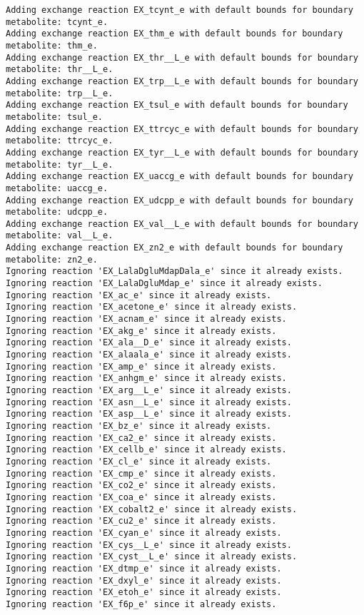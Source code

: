 \documentclass[
  letterpaper,
  DIV=11,
  numbers=noendperiod]{scrartcl}
\begin{document}
\begin{verbatim}
Adding exchange reaction EX_tcynt_e with default bounds for boundary metabolite: tcynt_e.
Adding exchange reaction EX_thm_e with default bounds for boundary metabolite: thm_e.
Adding exchange reaction EX_thr__L_e with default bounds for boundary metabolite: thr__L_e.
Adding exchange reaction EX_trp__L_e with default bounds for boundary metabolite: trp__L_e.
Adding exchange reaction EX_tsul_e with default bounds for boundary metabolite: tsul_e.
Adding exchange reaction EX_ttrcyc_e with default bounds for boundary metabolite: ttrcyc_e.
Adding exchange reaction EX_tyr__L_e with default bounds for boundary metabolite: tyr__L_e.
Adding exchange reaction EX_uaccg_e with default bounds for boundary metabolite: uaccg_e.
Adding exchange reaction EX_udcpp_e with default bounds for boundary metabolite: udcpp_e.
Adding exchange reaction EX_val__L_e with default bounds for boundary metabolite: val__L_e.
Adding exchange reaction EX_zn2_e with default bounds for boundary metabolite: zn2_e.
Ignoring reaction 'EX_LalaDgluMdapDala_e' since it already exists.
Ignoring reaction 'EX_LalaDgluMdap_e' since it already exists.
Ignoring reaction 'EX_ac_e' since it already exists.
Ignoring reaction 'EX_acetone_e' since it already exists.
Ignoring reaction 'EX_acnam_e' since it already exists.
Ignoring reaction 'EX_akg_e' since it already exists.
Ignoring reaction 'EX_ala__D_e' since it already exists.
Ignoring reaction 'EX_alaala_e' since it already exists.
Ignoring reaction 'EX_amp_e' since it already exists.
Ignoring reaction 'EX_anhgm_e' since it already exists.
Ignoring reaction 'EX_arg__L_e' since it already exists.
Ignoring reaction 'EX_asn__L_e' since it already exists.
Ignoring reaction 'EX_asp__L_e' since it already exists.
Ignoring reaction 'EX_bz_e' since it already exists.
Ignoring reaction 'EX_ca2_e' since it already exists.
Ignoring reaction 'EX_cellb_e' since it already exists.
Ignoring reaction 'EX_cl_e' since it already exists.
Ignoring reaction 'EX_cmp_e' since it already exists.
Ignoring reaction 'EX_co2_e' since it already exists.
Ignoring reaction 'EX_coa_e' since it already exists.
Ignoring reaction 'EX_cobalt2_e' since it already exists.
Ignoring reaction 'EX_cu2_e' since it already exists.
Ignoring reaction 'EX_cyan_e' since it already exists.
Ignoring reaction 'EX_cys__L_e' since it already exists.
Ignoring reaction 'EX_cyst__L_e' since it already exists.
Ignoring reaction 'EX_dtmp_e' since it already exists.
Ignoring reaction 'EX_dxyl_e' since it already exists.
Ignoring reaction 'EX_etoh_e' since it already exists.
Ignoring reaction 'EX_f6p_e' since it already exists.

\end{verbatim}
\end{document}

